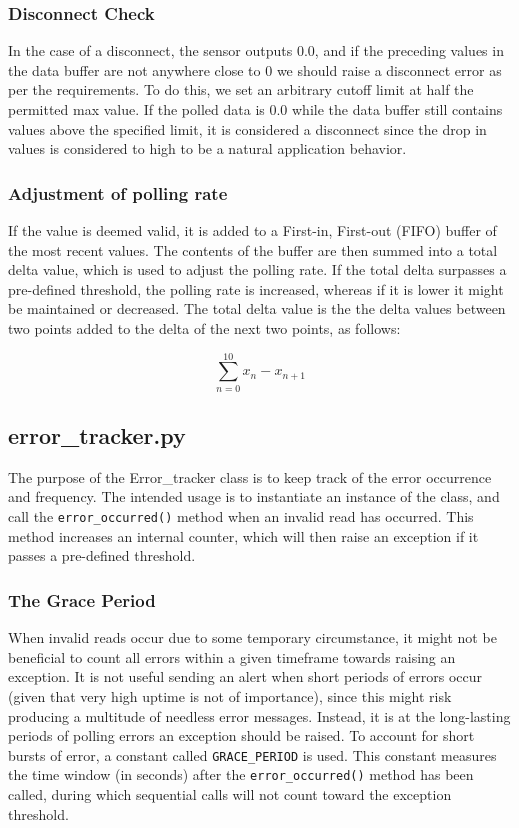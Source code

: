 \subsubsection{Disconnect Check}
In the case of a disconnect, the sensor outputs 0.0, and if the preceding values in the data buffer are not anywhere close to 0 we should raise a disconnect error as per the requirements. To do this, we set an arbitrary cutoff limit at half the permitted max value. If the polled data is 0.0 while the data buffer still contains values above the specified limit, it is considered a disconnect since the drop in values is considered to high to be a natural application behavior.

\subsubsection{Adjustment of polling rate}
If the value is deemed valid, it is added to a First-in, First-out (FIFO) buffer of the most recent values. The contents of the buffer are then summed into a total delta value, which is used to adjust the polling rate. If the total delta surpasses a pre-defined threshold, the polling rate is increased, whereas if it is lower it might be maintained or decreased. The total delta value is the the delta values between two points added to the delta of the next two points, as follows:

$$\sum_{n=0}^{10} x_n - x_{n+1}$$


\subsection{error\_tracker.py}
The purpose of the Error\_tracker class is to keep track of the error occurrence and frequency. The intended usage is to instantiate an instance of the class, and call the \lstinline{error_occurred()} method when an invalid read has occurred. This method increases an internal counter, which will then raise an exception if it passes a pre-defined threshold.

\subsubsection{The Grace Period}
When invalid reads occur due to some temporary circumstance, it might not be beneficial to count all errors within a given timeframe towards raising an exception. It is not useful sending an alert when short periods of errors occur (given that very high uptime is not of importance), since this might risk producing a multitude of needless error messages. Instead, it is at the long-lasting periods of polling errors an exception should be raised. To account for short bursts of error, a constant called \lstinline{GRACE_PERIOD} is used. This constant measures the time window (in seconds) after the \lstinline{error_occurred()} method has been called, during which sequential calls  will not count toward the exception threshold.

